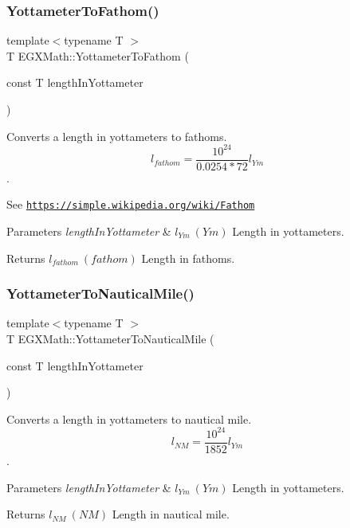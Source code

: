 \subsubsection{\texorpdfstring{Yottameter\+To\+Fathom()}{YottameterToFathom()}}
{\footnotesize\ttfamily template$<$typename T $>$ \\
T E\+G\+X\+Math\+::\+Yottameter\+To\+Fathom (\begin{DoxyParamCaption}\item[{const T}]{length\+In\+Yottameter }\end{DoxyParamCaption})}



Converts a length in yottameters to fathoms. \[ l_{fathom}= \frac{10^{24}}{0.0254 * 72} l_{Ym} \]. 

See \href{https://simple.wikipedia.org/wiki/Fathom}{\tt https\+://simple.\+wikipedia.\+org/wiki/\+Fathom} 
\begin{DoxyParams}{Parameters}
{\em length\+In\+Yottameter} & $ l_{Ym}\ (Ym)$ Length in yottameters. \\
\hline
\end{DoxyParams}
\begin{DoxyReturn}{Returns}
$ l_{fathom}\ (fathom)$ Length in fathoms. 
\end{DoxyReturn}
\mbox{\label{group___e_g_x_math-_conversions-_length_conversions-_s_i-_yottameter-_nautical_ga455b7f16dd9ff68f759f366def111300}} 
\subsubsection{\texorpdfstring{Yottameter\+To\+Nautical\+Mile()}{YottameterToNauticalMile()}}
{\footnotesize\ttfamily template$<$typename T $>$ \\
T E\+G\+X\+Math\+::\+Yottameter\+To\+Nautical\+Mile (\begin{DoxyParamCaption}\item[{const T}]{length\+In\+Yottameter }\end{DoxyParamCaption})}



Converts a length in yottameters to nautical mile. \[ l_{NM}= \frac{10^{24}}{1852} l_{Ym} \]. 


\begin{DoxyParams}{Parameters}
{\em length\+In\+Yottameter} & $ l_{Ym}\ (Ym)$ Length in yottameters. \\
\hline
\end{DoxyParams}
\begin{DoxyReturn}{Returns}
$ l_{NM}\ (NM)$ Length in nautical mile. 
\end{DoxyReturn}
